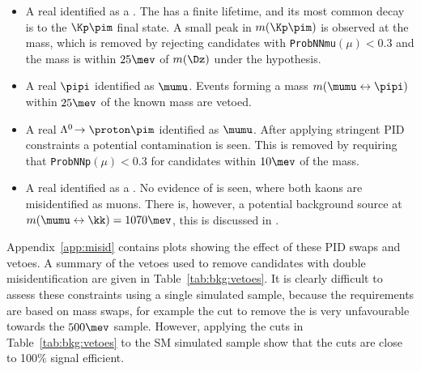 \begin{itemize}
  \item A real \kpi identified as a \mumu.
    The \Dz has a finite lifetime, and its most common decay is to the $\Kp\pim$ final state.
    A small peak in $m(\Kp\pim)$ is observed at the \Dz mass, which is removed
    by rejecting candidates with
    {\tt ProbNNmu$(\mu)<0.3$} and the \mumu mass is within $25\mev$ of $m(\Dz)$ under the \kpi hypothesis.
  \item A real $\pipi$ identified as $\mumu$.
    Events forming a mass $m(\mumu\leftrightarrow\pipi)$ within $25\mev$ of the known \KS mass are
    vetoed.
  \item A real $\Lambda^0\!\to\proton\pim$ identified as $\mumu$.
     After applying stringent PID constraints a potential \Lz contamination is seen.  This is removed by requiring that {\tt ProbNNp$(\mu)<0.3$} for candidates within $10\mev$ of the \Lz
    mass.
  \item A real \kk identified as a \mumu.  No evidence of \decay{\phi}{\kk} is seen, where both kaons are misidentified as
    muons.
    There is, however, a potential background source at $m(\mumu\leftrightarrow\kk)=1070\mev$, this
    is discussed in .
\end{itemize}
Appendix~\ref{app:misid} contains plots showing the effect of these PID swaps and vetoes.
A summary of the vetoes used to remove \Bp candidates with double misidentification are given in
Table~\ref{tab:bkg:vetoes}.
It is clearly difficult to assess these constraints using a single simulated sample, because the
requirements are based on mass swaps, for example the cut to remove the \KS is very unfavourable
towards the $500\mev$ sample.
However, applying the cuts in Table~\ref{tab:bkg:vetoes} to the SM \btokstrmumu simulated sample
show that the cuts are close to 100\% signal efficient.



